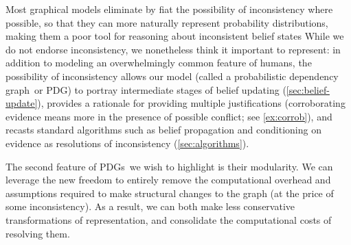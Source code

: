 \documentclass{article}
\newcommand{\modelname}{probabilistic dependency graph}
\newcommand{\MN}{PDG}
\newcommand{\MNs}{\MN s}
\begin{document}
		
	Most graphical models eliminate by fiat the possibility of inconsistency where possible, so that they can more naturally represent probability distributions, making them a poor tool for reasoning about inconsistent belief states
	While we do not endorse inconsistency, we nonetheless think it important to represent: in addition to modeling an overwhelmingly common feature of humans, the possibility of inconsistency 
	allows our model (called a \modelname\ or \MN)
	to portray intermediate stages of belief updating (\cref{sec:belief-update}), 
	provides a rationale for providing multiple justifications 
	(corroborating evidence means more in the presence of possible conflict; see \cref{ex:corrob}),
	and	recasts standard algorithms such as belief propagation and conditioning on evidence as resolutions of inconsistency (\cref{sec:algorithms}). 
	
		
	
	
	
	The second feature of \MNs\ we wish to highlight is their modularity. We can leverage the new freedom to entirely remove the computational overhead and assumptions required to make structural changes to the graph (at the price of some inconsistency). 
	As a result, we can both make less conservative transformations of representation, and consolidate the computational costs of resolving them.
	
\end{document}
